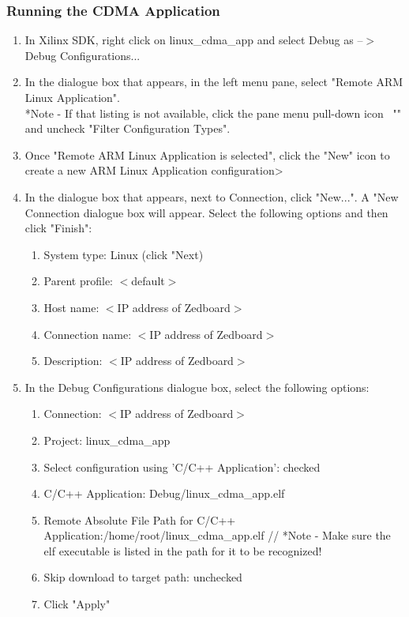 \subsubsection{Running the CDMA Application}
\begin{enumerate}
\item In Xilinx SDK, right click on linux\_cdma\_app and select Debug as --$>$ Debug Configurations...

\item In the dialogue box that appears, in the left menu pane, select "Remote ARM Linux Application".  \\
*Note - If that listing is not available, click the pane menu pull-down icon \, "\raisebox{-5pt}{\bf\large{\v{}}}" and uncheck "Filter Configuration Types".
\item Once "Remote ARM Linux Application is selected", click the "New" icon to create a new ARM Linux Application configuration>
\item In the dialogue box that appears, next to Connection, click "New...".  A "New Connection dialogue box will appear.  Select the following options and then click "Finish":
\begin{enumerate}
\item System type: Linux (click "Next)
\item Parent profile: $<$default$>$
\item Host name: $<$IP address of Zedboard$>$
\item Connection name: $<$IP address of Zedboard$>$
\item Description: $<$IP address of Zedboard$>$
\end{enumerate}
\item In the Debug Configurations dialogue box, select the following options:
\begin{enumerate}
\item Connection: $<$IP address of Zedboard$>$
\item Project: linux\_cdma\_app
\item Select configuration using 'C/C++ Application': checked
\item C/C++ Application: Debug/linux\_cdma\_app.elf
\item Remote Absolute File Path for C/C++ Application:/home/root/linux\_cdma\_app.elf //
*Note - Make sure the elf executable is listed in the path for it to be recognized!
\item Skip download to target path: unchecked
\item Click "Apply"
\end{enumerate}


\end{enumerate}
